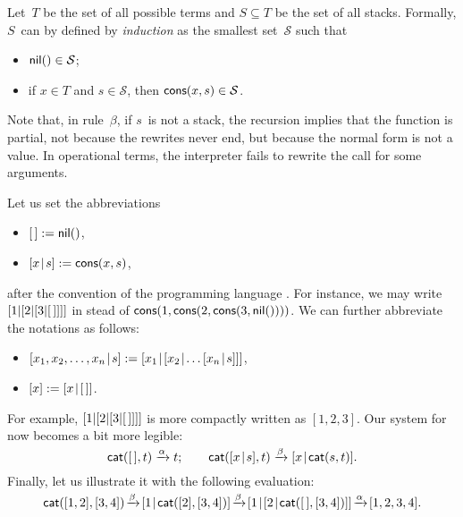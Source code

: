 Let~\(T\) be the set of all possible terms and \(S \subseteq T\) be
the set of all stacks. Formally, \(S\)~can by defined by
\emph{induction} as the smallest set~\(\mathcal{S}\) such
that
\begin{itemize}

  \item \(\textsf{nil}() \in \mathcal{S}\);\label{def:stack}

  \item if \(x \in T\) and \(s \in \mathcal{S}\), then
    \(\textsf{cons}(x,s) \in \mathcal{S}\).

\end{itemize}

Note that, in rule~\(\beta\), if \(s\)~is not a stack, the recursion
implies that the function  is partial, not because the
rewrites never end, but because the normal form is not a value. In operational terms, the
interpreter fails to rewrite the call for some arguments.

Let us set the abbreviations
\begin{itemize}

  \item \([\,] := \textsf{nil}()\),

  \item \([{x}\!\mid\!{s}] := \textsf{cons}(x,s)\),

\end{itemize}
after the convention of the programming language \Prolog
\citep{SterlingShapiro_1994,Bratko_2000}. For instance, we may write
\([1|[2|[3|[\,]]]]\) in stead of
\(\textsf{cons}(1,\textsf{cons}(2,\textsf{cons}(3,\textsf{nil}())))\).  We can
further abbreviate the notations as follows:
\begin{itemize}

  \item \(\cons{x_1,x_2,\dots,x_n}{s} := \cons{x_1}{\cons{x_2}{\dots
      \cons{x_n}{s}}}\),

  \item \([x] := [{x}\!\mid\!{[\,]}]\).

\end{itemize}
For example, \([1|[2|[3|[\,]]]]\) is more compactly written as
\([1,2,3]\). Our system for  now
becomes a bit more legible:
\begin{equation}
\fun{cat}(        \el,t) \xrightarrow{\smash{\alpha}} t;\qquad
\fun{cat}(\cons{x}{s},t) \xrightarrow{\smash{\beta}}
\cons{x}{\fun{cat}(s,t)}.
\label{def:cat}\index{stack!catenation!definition}
\end{equation}
Finally, let us illustrate it with the following
evaluation:
\begin{equation*}
\fun{cat}([1,2],[3,4])
\!\xrightarrow{\smash{\beta}}\!
\cons{1}{\fun{cat}([2],[3,4])}
\!\xrightarrow{\smash{\beta}}\!
\cons{1}{\cons{2}{\fun{cat}(\el,[3,4])}}
\!\xrightarrow{\smash{\alpha}}\!
[1,2,3,4].
\end{equation*}

